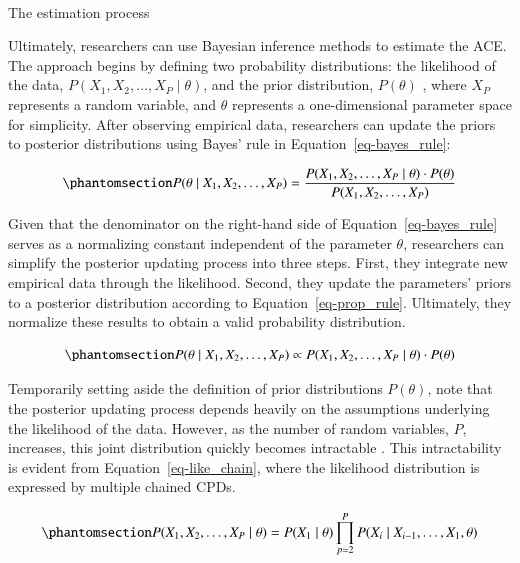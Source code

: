 \documentclass[
  authoryear,
  review,
  1p]{elsarticle}
\makeatletter
\let\oldparagraph\paragraph
\renewcommand{\paragraph}{
    \@ifstar
      \xxxParagraphStar
      \xxxParagraphNoStar
  }
\newcommand{\xxxParagraphStar}[1]{\oldparagraph*{#1}\mbox{}}
\newcommand{\xxxParagraphNoStar}[1]{\oldparagraph{#1}\mbox{}}
\makeatother
\begin{document}
\paragraph{The estimation process}\label{sec-appendixB34}

Ultimately, researchers can use Bayesian inference methods to estimate
the ACE. The approach begins by defining two probability distributions:
the likelihood of the data,
\(P(X_{1}, X_{2}, \dots, X_{P} \mid \theta)\), and the prior
distribution, \(P(\theta)\) \citep{Everitt_et_al_2010}, where \(X_{P}\)
represents a random variable, and \(\theta\) represents a
one-dimensional parameter space for simplicity. After observing
empirical data, researchers can update the priors to posterior
distributions using Bayes' rule in Equation~\ref{eq-bayes_rule}:

\begin{equation}\protect\phantomsection\label{eq-bayes_rule}{
P(\theta \mid X_{1}, X_{2}, \dots, X_{P}) = \frac{P(X_{1}, X_{2}, \dots, X_{P} \mid \theta) \cdot P(\theta)}{P(X_{1}, X_{2}, \dots, X_{P})}
}\end{equation}

Given that the denominator on the right-hand side of
Equation~\ref{eq-bayes_rule} serves as a normalizing constant
independent of the parameter \(\theta\), researchers can simplify the
posterior updating process into three steps. First, they integrate new
empirical data through the likelihood. Second, they update the
parameters' priors to a posterior distribution according to
Equation~\ref{eq-prop_rule}. Ultimately, they normalize these results to
obtain a valid probability distribution.

\begin{equation}\protect\phantomsection\label{eq-prop_rule}{
P(\theta \mid X_{1}, X_{2}, \dots, X_{P}) \propto P(X_{1}, X_{2}, \dots, X_{P}\mid \theta) \cdot P(\theta)
}\end{equation}

Temporarily setting aside the definition of prior distributions
\(P(\theta)\), note that the posterior updating process depends heavily
on the assumptions underlying the likelihood of the data. However, as
the number of random variables, \(P\), increases, this joint
distribution quickly becomes intractable \citep{Neal_2020}. This
intractability is evident from Equation~\ref{eq-like_chain}, where the
likelihood distribution is expressed by multiple chained CPDs.

\begin{equation}\protect\phantomsection\label{eq-like_chain}{
P(X_{1}, X_{2}, \dots, X_{P} \mid \theta) = P(X_{1} \mid \theta) \prod^{P}_{p=2} P(X_{i} \mid X_{i-1}, \dots, X_{1}, \theta )
}\end{equation}
\end{document}
